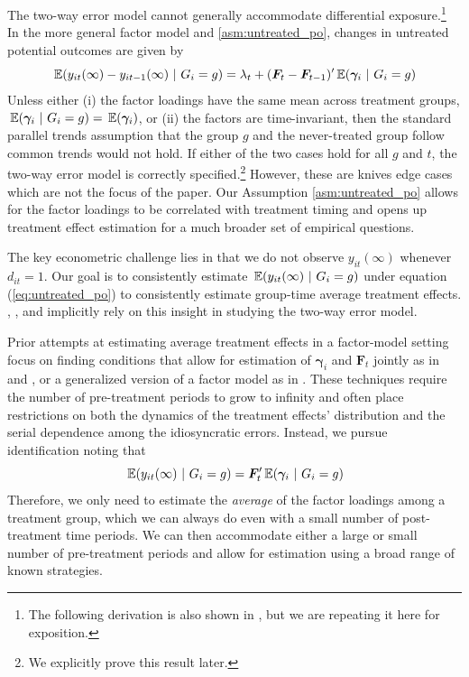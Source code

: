 \documentclass[12pt]{article}
\begin{document}
The two-way error model cannot generally accommodate differential exposure.\footnote{The following derivation is also shown in \citet{Callaway_Karami_2020}, but we are repeating it here for exposition.} In the more general factor model and \autoref{asm:untreated_po}, changes in untreated potential outcomes are given by
\begin{equation*}
  \expec{y_{it}(\infty) - y_{it-1}(\infty)}{G_i = g} = \lambda_t + (\bm{F}_t - \bm{F}_{t-1})' \expec{\bm \gamma_i}{G_i = g}
\end{equation*}
Unless either (i) the factor loadings have the same mean across treatment groups, $\expec{\bm \gamma_i}{G_i = g} = \expec{\bm \gamma_i}$, or (ii) the factors are time-invariant, then the standard parallel trends assumption that the group $g$ and the never-treated group follow common trends would not hold. If either of the two cases hold for all $g$ and $t$, the two-way error model is correctly specified.\footnote{We explicitly prove this result later.} However, these are knives edge cases which are not the focus of the paper. Our Assumption \ref{asm:untreated_po} allows for the factor loadings to be correlated with treatment timing and opens up treatment effect estimation for a much broader set of empirical questions.

The key econometric challenge lies in that we do not observe $y_{it}(\infty)$ whenever $d_{it} = 1$. Our goal is to consistently estimate $\expec{y_{it}(\infty)}{G_i = g}$ under equation (\ref{eq:untreated_po}) to consistently estimate group-time average treatment effects. \citet{Gardner_2021}, \citet{Wooldridge_2021}, and \citet{Borusyak_Jaravel_Spiess_2021} implicitly rely on this insight in studying the two-way error model. 

Prior attempts at estimating average treatment effects in a factor-model setting focus on finding conditions that allow for estimation of $\bm \gamma_i$ and $\bm{F}_t$ jointly as in \citet{Gobillon_Magnac_2016} and \citet{Xu_2017}, or a generalized version of a factor model as in \citet{arkhangelsky2021synthetic}. These techniques require the number of pre-treatment periods to grow to infinity and often place restrictions on both the dynamics of the treatment effects' distribution and the serial dependence among the idiosyncratic errors. Instead, we pursue identification noting that 
\begin{equation}\label{eq:untreated_cond_expectation}
\expec{y_{it}(\infty)}{G_i = g} = \bm{F}_t' \expec{\bm \gamma_i}{G_i = g}
\end{equation}
Therefore, we only need to estimate the \emph{average} of the factor loadings among a treatment group, which we can always do even with a small number of post-treatment time periods. We can then accommodate either a large or small number of pre-treatment periods and allow for estimation using a broad range of known strategies.
\end{document}
